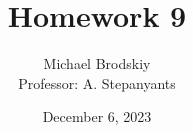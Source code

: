 


\title{Homework 9}
\date{December 6, 2023}
\author{Michael Brodskiy\\ \small Professor: A. Stepanyants}



\maketitle

